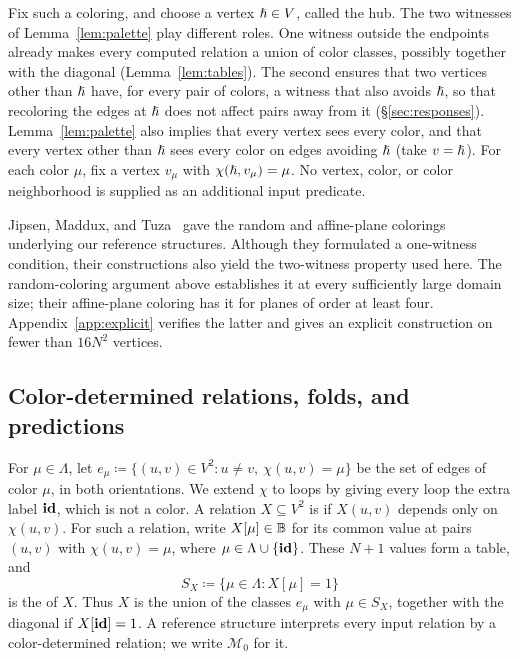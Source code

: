 Fix such a coloring, and choose a vertex $\hslash\in V$, called the
hub. The two witnesses of Lemma~\ref{lem:palette} play different
roles. One witness outside the endpoints already makes every computed
relation a union of color classes, possibly together with the diagonal
(Lemma~\ref{lem:tables}). The second ensures that two vertices other
than $\hslash$ have, for every pair of colors, a witness that also avoids
$\hslash$, so that recoloring the edges at $\hslash$ does not affect pairs away
from it (\S\ref{sec:responses}). Lemma~\ref{lem:palette} also implies that
every vertex sees every color, and that every vertex other than $\hslash$
sees every color on edges avoiding $\hslash$ (take $v=\hslash$). For each color
$\mu$, fix a vertex $v_\mu$ with $\chi(\hslash,v_\mu)=\mu$. No vertex,
color, or color neighborhood is supplied as an additional input
predicate.

Jipsen, Maddux, and Tuza~\citep{jipsen-maddux-tuza1995} gave
the random and affine-plane colorings underlying our reference
structures. Although they formulated a one-witness condition, their
constructions also yield the two-witness property used here. The
random-coloring argument above establishes it at every sufficiently
large domain size; their affine-plane coloring has it for planes of
order at least four. Appendix~\ref{app:explicit} verifies the latter
and gives an explicit construction on fewer than $16N^2$ vertices.

\subsection{Color-determined relations, folds, and predictions}\label{sec:types}
For $\mu\in\Lambda$, let
$e_\mu\coloneqq\{(u,v)\in V^2:u\ne v,\ \chi(u,v)=\mu\}$ be the set of edges of
color $\mu$, in both orientations. We extend $\chi$ to loops by giving
every loop the extra label $\mathbf{id}$, which is not a color. A relation
$X\subseteq V^2$ is  if $X(u,v)$ depends only
on $\chi(u,v)$. For such a relation, write $X[\mu]\in\mathbb B$ for its
common value at pairs $(u,v)$ with $\chi(u,v)=\mu$, where
$\mu\in\Lambda\cup\{\mathbf{id}\}$. These $N+1$ values form a table, and
\[
 S_X\coloneqq\{\mu\in\Lambda:X[\mu]=1\}
\]
is the  of $X$. Thus $X$ is the union of the
classes $e_\mu$ with $\mu\in S_X$, together with the diagonal if
$X[\mathbf{id}]=1$. A reference structure interprets every input relation
by a color-determined relation; we write $\mathcal M_0$ for it.

